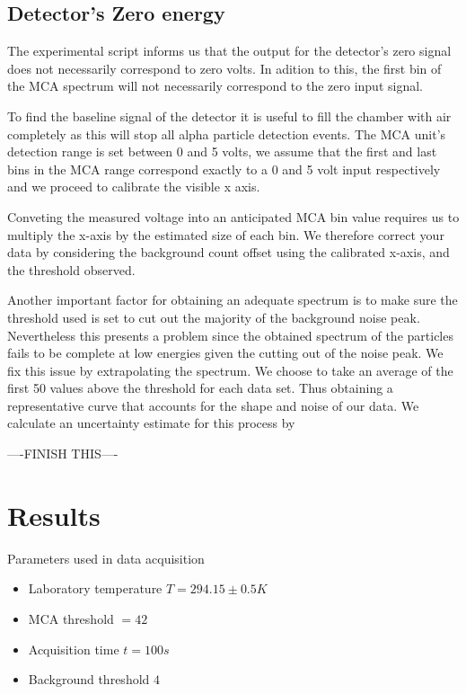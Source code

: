 \documentclass[a4paper]{article}
\begin{document}
\begin{multicols}{2}
\subsection{Detector's Zero energy}
The experimental script informs us that the output for the detector's zero signal does not necessarily correspond to zero volts. In adition to this, the first bin of the MCA spectrum will not necessarily correspond to the zero input signal\cite{SPA}.

To find the baseline signal of the detector it is useful to fill  the  chamber  with  air  completely as this will  stop  all  alpha  particle  detection events\cite{SPA}.
The  MCA  unit’s detection range is set between 0 and 5 volts, we assume that the first and last bins in the MCA range correspond exactly to a 0 and 5 volt input respectively and we proceed to calibrate the visible x axis. 

Conveting the measured voltage into an anticipated MCA bin value requires us to multiply the x-axis by the estimated size of each bin.
We therefore correct your data by considering the background count offset using the calibrated x-axis, and the threshold observed.

Another important factor for obtaining an adequate spectrum is to make sure the threshold used is set to cut out the majority of the background noise peak. Nevertheless this presents a problem since the obtained spectrum of the particles fails to be complete at low energies given the cutting out of the noise peak. We fix this issue by extrapolating the spectrum. We choose to take an average of the first 50 values above the threshold for each data set. Thus obtaining a representative curve that accounts for the shape and noise of our data. 
We calculate an uncertainty estimate for this process by

----FINISH THIS----



\section{Results}
Parameters used in data acquisition
\begin{itemize}
    \item Laboratory temperature $T = 294.15 \pm 0.5 K$
    \item MCA threshold $ = 42$
    \item Acquisition time $t = 100s$
    \item Background threshold $4$
\end{itemize}


\end{multicols}
\end{document}

